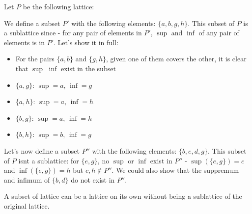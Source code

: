 \begin{example} Let $P$ be the following lattice:
\begin{center}
\end{center}

We define a subset $P'$ with the following elements: $\{a,b,g,h\}$. This subset
of $P$ is a sublattice since - for any pair of elements in $P'$, $\sup$ and
$\inf$ of any pair of elements is in $P'$. Let's show it in full:
\begin{itemize}
\item For the pairs $\{a,b\}$ and $\{g,h\}$, given one of them covers the other,
it is clear that $\sup$ $\inf$ exist in the subset
\item $\{a,g\}$: $\sup = a$, $\inf = g$
\item $\{a,h\}$: $\sup = a$, $\inf = h$
\item $\{b,g\}$: $\sup = a$, $\inf = h$
\item $\{b,h\}$: $\sup = b$, $\inf = g$
\end{itemize}

Let's now define a subset $P''$ with the following elements: $\{b,e,d,g\}$. This
subset of $P$ isnt a sublattice: for $\{e,g\}$, no $\sup$ or $\inf$ exist in
$P''$ - $\sup(\{e,g\})=c$ and $\inf(\{e,g\})=h$ but $c,h \notin P''$. We could
also show that the suppremum and infimum of $\{b,d\}$ do not exist in $P''$.
\end{example}

\begin{remark} A subset of lattice can be a lattice on its own without being a
sublattice of the original lattice.
\end{remark}

